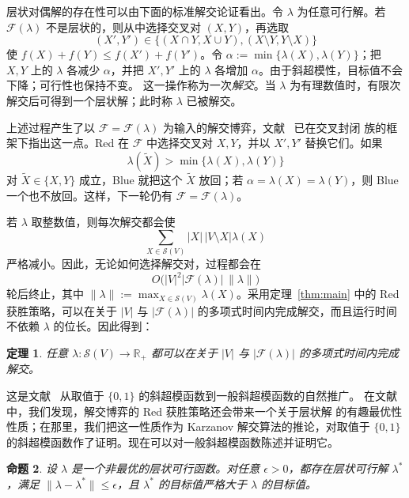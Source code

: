 \documentclass[UTF8,11pt,a4paper]{ctexart}
\newtheorem{theorem}{定理}
\newtheorem{proposition}[theorem]{命题}
\numberwithin{equation}{section}
\newcommand{\calS}{\mathcal S}
\newcommand{\calF}{\mathcal F}
\newcommand{\R}{\mathbb R}
\begin{document}
层状对偶解的存在性可以由下面的标准解交论证看出。令 $\lambda$ 为任意可行解。若
$\calF(\lambda)$ 不是层状的，则从中选择交叉对 $(X,Y)$，再选取
\[
(X',Y')\in\bigl\{(X\cap Y,X\cup Y),
(X\setminus Y,Y\setminus X)\bigr\}
\]
使 $f(X)+f(Y)\le f(X')+f(Y')$。令
$\alpha:=\min\{\lambda(X),\lambda(Y)\}$；把 $X,Y$ 上的 $\lambda$ 各减少 $\alpha$，并把
$X',Y'$ 上的 $\lambda$ 各增加 $\alpha$。由于斜超模性，目标值不会下降；可行性也保持不变。
这一操作称为一次\emph{解交}。当 $\lambda$ 为有理数值时，有限次解交后可得到一个层状解；此时称
$\lambda$ 已被解交。

上述过程产生了以 $\calF=\calF(\lambda)$ 为输入的解交博弈，文献~\cite{Karzanov} 已在交叉封闭
族的框架下指出这一点。Red 在 $\calF$ 中选择交叉对 $X,Y$，并以 $X',Y'$ 替换它们。如果
\[
\lambda(\widetilde X)>\min\{\lambda(X),\lambda(Y)\}
\]
对 $\widetilde X\in\{X,Y\}$ 成立，Blue 就把这个 $\widetilde X$ 放回；若
$\alpha=\lambda(X)=\lambda(Y)$，则 Blue 一个也不放回。这样，下一轮仍有
$\calF=\calF(\lambda)$。

若 $\lambda$ 取整数值，则每次解交都会使
\[
\sum_{X\in\calS(V)}|X|\,|V\setminus X|\lambda(X)
\]
严格减小。因此，无论如何选择解交对，过程都会在
\[
O\bigl(|V|^2|\calF(\lambda)|\,\|\lambda\|\bigr)
\]
轮后终止，其中 $\|\lambda\|:=\max_{X\in\calS(V)}\lambda(X)$。采用定理~\ref{thm:main}
中的 Red 获胜策略，可以在关于 $|V|$ 与 $|\calF(\lambda)|$ 的多项式时间内完成解交，而且运行时间
不依赖 $\lambda$ 的位长。因此得到：

\begin{theorem}\label{thm:uncross}
任意 $\lambda:\calS(V)\to\R_+$ 都可以在关于 $|V|$ 与 $|\calF(\lambda)|$ 的多项式时间内完成解交。
\end{theorem}

这是文献~\cite[Theorem~2]{Karzanov} 从取值于 $\{0,1\}$ 的斜超模函数到一般斜超模函数的自然推广。
在文献~\cite[Section~3.3]{HiraiPap} 中，我们发现，解交博弈的 Red 获胜策略还会带来一个关于层状解
的有趣最优性性质；在那里，我们把这一性质作为 Karzanov 解交算法的推论，对取值于
$\{0,1\}$ 的斜超模函数作了证明。现在可以对一般斜超模函数陈述并证明它。

\begin{proposition}\label{prop:local}
设 $\lambda$ 是一个非最优的层状可行函数。对任意 $\epsilon>0$，都存在层状可行解
$\lambda^*$，满足 $\|\lambda-\lambda^*\|\le\epsilon$，且 $\lambda^*$ 的目标值严格大于
$\lambda$ 的目标值。
\end{proposition}
\end{document}
